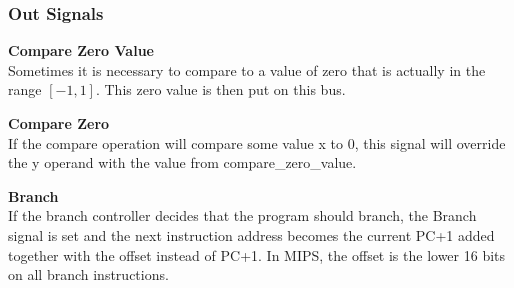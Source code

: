 \subsubsection{Out Signals}

\begin{description}
\item{\textbf{Compare Zero Value}} \\

Sometimes it is necessary to compare to a value of zero that is actually in the range $[-1,1]$.
This zero value is then put on this bus.

\item{\textbf{Compare Zero}} \\

If the compare operation will compare some value x to 0, this signal will override the y operand with the value from compare\_zero\_value.

\item{\textbf{Branch}} \\

If the branch controller decides that the program should branch, the Branch signal is set and the next instruction address becomes the current PC+1 added together with the offset instead of PC+1.
In MIPS, the offset is the lower 16 bits on all branch instructions.

\end{description}

